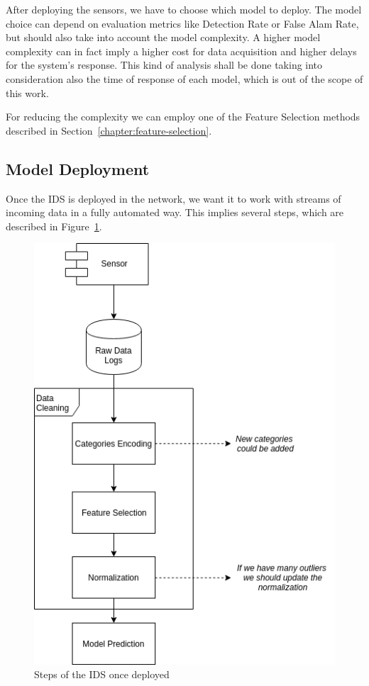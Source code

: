 After deploying the sensors, we have to choose which model to deploy. The model choice can depend on evaluation metrics like Detection Rate or False Alam Rate, but should also take into account the model complexity. A higher model complexity can in fact imply a higher cost for data acquisition and higher delays for the system's response. This kind of analysis shall be done taking into consideration also the time of response of each model, which is out of the scope of this work.

For reducing the complexity we can employ one of the Feature Selection methods described in Section~\ref{chapter:feature-selection}.

\subsection{Model Deployment}

Once the IDS is deployed in the network, we want it to work with streams of incoming data in a fully automated way. This implies several steps, which are described in Figure~\ref{fig:dplsteps}.

\begin{figure}[h]
    \center
    \includegraphics[width=\linewidth]{img/ids-dpl.png}
    \caption{Steps of the IDS once deployed}
    \label{fig:dplsteps}
\end{figure}

